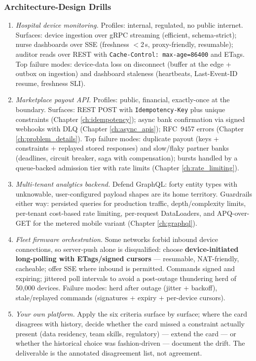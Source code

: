 \subsubsection*{Architecture-Design Drills}

\begin{enumerate}[label=\textbf{Drill \arabic*.}, leftmargin=2.8em]
  \item \emph{Hospital device monitoring.} Profiles: internal, regulated,
    no public internet. Surfaces: device ingestion over gRPC streaming
    (efficient, schema-strict); nurse dashboards over SSE (freshness
    $<$2\,s, proxy-friendly, resumable); auditor reads over REST with
    \texttt{Cache-Control: max-age=86400} and ETags. Top failure modes:
    device-data loss on disconnect (buffer at the edge + outbox on
    ingestion) and dashboard staleness (heartbeats, Last-Event-ID resume,
    freshness SLI).
  \item \emph{Marketplace payout API.} Profiles: public, financial,
    exactly-once at the boundary. Surfaces: REST POST with
    \texttt{Idempotency-Key} plus unique constraints (Chapter
    \ref{ch:idempotency}); async bank confirmation via signed webhooks
    with DLQ (Chapter \ref{ch:async_apis}); RFC~9457 errors (Chapter
    \ref{ch:problem_details}). Top failure modes: duplicate payout
    (keys + constraints + replayed stored responses) and slow/flaky
    partner banks (deadlines, circuit breaker, saga with compensation);
    bursts handled by a queue-backed admission tier with rate limits
    (Chapter \ref{ch:rate_limiting}).
  \item \emph{Multi-tenant analytics backend.} Defend GraphQL: forty entity
    types with unknowable, user-configured payload shapes are its home
    territory. Guardrails either way: persisted queries for production
    traffic, depth/complexity limits, per-tenant cost-based rate limiting,
    per-request DataLoaders, and APQ-over-GET for the metered mobile
    variant (Chapter \ref{ch:graphql}).
  \item \emph{Fleet firmware orchestration.} Some networks forbid inbound
    device connections, so server-push alone is disqualified: choose
    \textbf{device-initiated long-polling with ETags/signed cursors} ---
    resumable, NAT-friendly, cacheable; offer SSE where inbound is
    permitted. Commands signed and expiring; jittered poll intervals to
    avoid a post-outage thundering herd of 50{,}000 devices. Failure modes:
    herd after outage (jitter + backoff), stale/replayed commands
    (signatures + expiry + per-device cursors).
  \item \emph{Your own platform.} Apply the six criteria surface by
    surface; where the card disagrees with history, decide whether the
    card missed a constraint actually present (data residency, team
    skills, regulatory) --- extend the card --- or whether the historical
    choice was fashion-driven --- document the drift. The deliverable is
    the annotated disagreement list, not agreement.
\end{enumerate}

